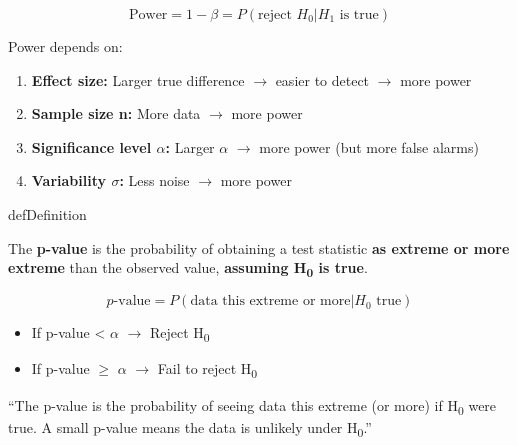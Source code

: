 
\[\text{Power} = 1 - \beta = P(\text{reject } H_0 | H_1 \text{ is true})\]

Power depends on:

\begin{enumerate}
\def\labelenumi{\arabic{enumi}.}
\tightlist
\item
  \textbf{Effect size:} Larger true difference \ensuremath{\to} easier to detect \ensuremath{\to} more power
\item
  \textbf{Sample size n:} More data \ensuremath{\to} more power
\item
  \textbf{Significance level \ensuremath{\alpha}:} Larger \ensuremath{\alpha} \ensuremath{\to} more power (but more false alarms)
\item
  \textbf{Variability \ensuremath{\sigma}:} Less noise \ensuremath{\to} more power
\end{enumerate}


\begin{PSbox}[unbreakable]{def}{Definition}

The \textbf{p-value} is the probability of obtaining a test statistic \textbf{as extreme or more extreme} than the observed value, \textbf{assuming H\textsubscript{0} is true}.

\[p\text{-value} = P(\text{data this extreme or more} | H_0 \text{ true})\]

\end{PSbox}


\begin{itemize}
\tightlist
\item
  If p-value \textless{} \ensuremath{\alpha} \ensuremath{\to} Reject H\textsubscript{0}
\item
  If p-value \ensuremath{\ge} \ensuremath{\alpha} \ensuremath{\to} Fail to reject H\textsubscript{0}
\end{itemize}


\begin{PSquote}

``The p-value is the probability of seeing data this extreme (or more) if H\textsubscript{0} were true. A small p-value means the data is unlikely under H\textsubscript{0}.''

\end{PSquote}


